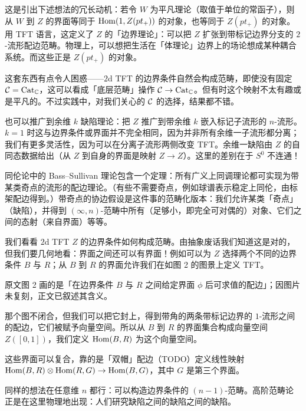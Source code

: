 这是引出下述想法的冗长动机：若令 $W$ 为平凡理论（取值于单位的常函子），则从 $W$ 到 $Z$ 的界面等同于 $\operatorname{Hom}(1,Z(pt_+))$ 的对象，也等同于 $Z(pt_+)$ 的对象。用 TFT 语言，这定义了 $Z$ 的「边界理论」：可以把 $Z$ 扩张到带标记边界分支的 $2$-流形配边范畴。物理上，可以想把生活在「体理论」边界上的场论想成某种耦合系统。而这些正是 $Z(pt_+)$ 的对象。

这套东西有点令人困惑——$2$d TFT 的边界条件自然会构成范畴，即使没有固定 $\mathcal{C}=\mathrm{Cat}_{\mathbb{C}}$，这可以看成「底层范畴」操作 $\mathcal{C}\to\mathrm{Cat}_{\mathbb{C}}$。但有时这个映射不太有趣或是平凡的。不过实践中，对我们关心的 $\mathcal{C}$ 的选择，结果都不错。

也可以推广到余维 $k$ 缺陷理论：把 $Z$ 推广到带余维 $k$ 嵌入标记子流形的 $n$-流形。$k=1$ 时这与边界条件或界面并不完全相同，因为并非所有余维一子流形都分离；我们有更多灵活性，因为可以在分离子流形两侧改变 TFT。余维一缺陷由 $Z$ 的自同态数据给出（从 $Z$ 到自身的界面是映射 $Z\to Z$）。这里的差别在于 $S^0$ 不连通！

\begin{remark}
同伦论中的 Bass–Sullivan 理论包含一个定理：所有广义上同调理论都可实现为带某类奇点的流形的配边理论。（有些不需要奇点，例如球谱表示稳定上同伦，由标架配边得到。）带奇点的协边假设是这件事的范畴化版本：我们允许某类「奇点」（缺陷），并得到 $(\infty,n)$-范畴中所有（足够小，即完全可对偶的）对象、它们之间的态射（来自界面）等等。
\end{remark}

我们看看 $2$d TFT $Z$ 的边界条件如何构成范畴。由抽象废话我们知道这是对的，但我们要几何地看：界面之间还可以有界面！例如可以为 $Z$ 选择两个不同的边界条件 $B$ 与 $R$；从 $B$ 到 $R$ 的界面允许我们在如图 2 的图景上定义 TFT。

原文图 2 画的是「在边界条件 $B$ 与 $R$ 之间给定界面 $\phi$ 后可求值的配边」；因图片未复刻，正文已叙述其含义。

那个图不闭合，但我们可以把它封上，得到带角的两条带标记边界的 $1$-流形之间的配边，它们被赋予向量空间。所以从 $B$ 到 $R$ 的界面集合构成向量空间 $Z([0,1])$，我们定义 $\operatorname{Hom}(B,R)$ 为这个向量空间。

这些界面可以复合，靠的是「双帽」配边（TODO）定义线性映射 $\operatorname{Hom}(B,R)\otimes\operatorname{Hom}(R,G)\to\operatorname{Hom}(B,G)$，其中 $G$ 是第三个界面。

同样的想法在任意维 $n$ 都行：可以构造边界条件的 $(n-1)$-范畴。高阶范畴论正是在这里物理地出现：人们研究缺陷之间的缺陷之间的缺陷。

